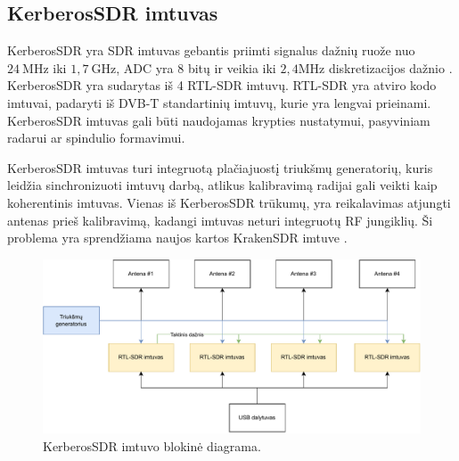 \documentclass[main.tex]{subfiles}
\begin{document}
\subsection{KerberosSDR imtuvas}\label{sec:kerberossdr}

KerberosSDR yra SDR imtuvas gebantis priimti signalus dažnių ruože nuo $24\ \mathrm{MHz}$
iki $1,7\ \mathrm{GHz}$, ADC yra 8 bitų ir veikia iki $2,4 \mathrm{MHz}$ diskretizacijos dažnio
\cite{kerberossdr}.
KerberosSDR yra sudarytas iš 4 RTL-SDR imtuvų. RTL-SDR yra atviro kodo imtuvai, padaryti iš
DVB-T standartinių imtuvų, kurie yra lengvai prieinami. KerberosSDR imtuvas
gali būti naudojamas krypties nustatymui, pasyviniam radarui ar spindulio formavimui.

KerberosSDR imtuvas turi integruotą plačiajuostį triukšmų generatorių, kuris leidžia
sinchronizuoti imtuvų darbą, atlikus kalibravimą radijai gali veikti kaip koherentinis imtuvas.
Vienas iš KerberosSDR trūkumų, yra reikalavimas atjungti antenas prieš kalibravimą, kadangi
imtuvas neturi integruotų RF jungiklių. Ši problema yra sprendžiama naujos kartos KrakenSDR
imtuve \cite{krakensdr}.

\begin{figure}[h]
    \begin{centering}
    \includegraphics[scale=0.8]{drawings/kerberos_sdr_blockdiagram}
    \par\end{centering}
    \protect\caption{\label{fig:kerberos_block}KerberosSDR imtuvo blokinė diagrama.}
\end{figure}
\end{document}
